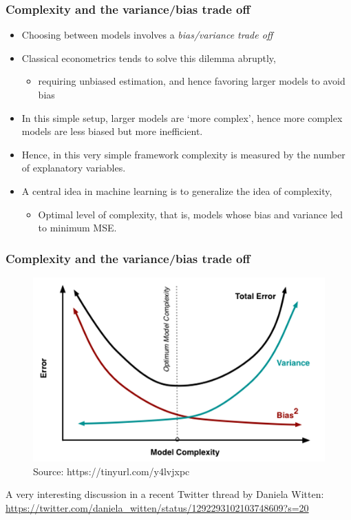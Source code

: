 \documentclass[
  shownotes,
  xcolor={svgnames},
  hyperref={colorlinks,citecolor=DarkBlue,linkcolor=DarkRed,urlcolor=DarkBlue}
  , aspectratio=169]{beamer}
\begin{document}
\begin{frame}
\frametitle{Complexity and the variance/bias trade off}


\begin{itemize}
  \item Choosing between models involves a {\it bias/variance trade off}
  \medskip
\item Classical econometrics tends to solve this dilemma abruptly, 
  \begin{itemize}
    \item  requiring unbiased estimation, and hence favoring larger models to avoid bias
  \end{itemize}
\medskip
\item In this simple setup, larger models are `more complex', hence more complex models are less biased but more inefficient. 
\medskip
\item Hence, in this very simple framework complexity is measured by the number of explanatory variables. 
\medskip
\item A central idea in machine learning is to generalize the idea of complexity, 
  \begin{itemize}
    \item Optimal level of complexity, that is, models whose bias and variance led to minimum MSE.
  \end{itemize}
\end{itemize}

\end{frame}
\begin{frame}[fragile]
\frametitle{Complexity and the variance/bias trade off}




\begin{figure}[H] \centering
  \centering
  \includegraphics[scale=0.50]{figures/medium_bias_variance_trade_off.png}
  \\
  \tiny
  Source: https://tinyurl.com/y4lvjxpc
\end{figure}


{\tiny A very interesting discussion in a recent Twitter thread by Daniela Witten: \url{https://twitter.com/daniela_witten/status/1292293102103748609?s=20}}
\end{frame}
\end{document}
